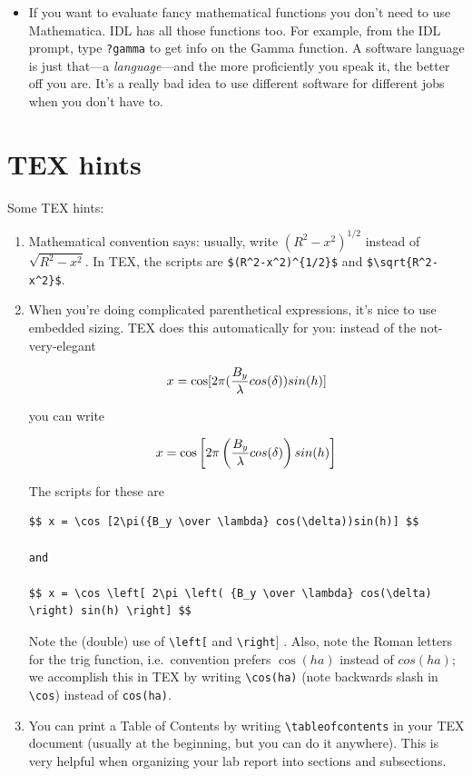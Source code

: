 \documentclass[12pt,preprint]{aastex}
\begin{document}
\begin{itemize}
\item If you want to evaluate fancy mathematical functions you don't
need to use Mathematica.  IDL has all those functions too.  For example,
from the IDL prompt, type \verb$?gamma$ to get info on the Gamma
function.  A software language is just that---a {\it language}---and the
more proficiently you speak it, the better off you are.  It's a really
bad idea to use different software for different jobs when you don't
have to. 

\end{itemize}

\section{TEX hints}

	Some TEX hints: \begin{enumerate}

	\item Mathematical convention says: usually, write
$(R^2-x^2)^{1/2}$ instead of $\sqrt{R^2-x^2}$.  In TEX, the scripts are
\verb&$(R^2-x^2)^{1/2}$& and \verb&$\sqrt{R^2-x^2}$&. 

	\item When you're doing complicated parenthetical expressions,
it's nice to use embedded sizing. TEX does this automatically for you:
instead of the not-very-elegant

$$ x = \cos [2\pi({B_y \over \lambda} cos(\delta))sin(h)] $$

\noindent you can write

$$ x = \cos \left[ 2\pi \left( {B_y \over \lambda} cos(\delta) \right) sin(h) \right] $$

\noindent The scripts for these are

\begin{verbatim} 
$$ x = \cos [2\pi({B_y \over \lambda} cos(\delta))sin(h)] $$

and

$$ x = \cos \left[ 2\pi \left( {B_y \over \lambda} cos(\delta) \right) sin(h) \right] $$
\end{verbatim}

\noindent Note the (double) use of \verb$\left[$ and \verb$\right$] . 
Also, note the Roman letters for the trig function, i.e.\ convention
prefers $\cos(ha)$ instead of $cos(ha)$; we accomplish this in TEX by
writing \verb$\cos(ha)$ (note backwards slash in \verb$\cos$) instead of
\verb$cos(ha)$. 

\item You can print a Table of Contents by writing
\verb$\tableofcontents$ in your TEX document (usually at the beginning,
but you can do it anywhere). This is very helpful when
organizing your lab report into sections and subsections.


\end{enumerate}
\end{document}
